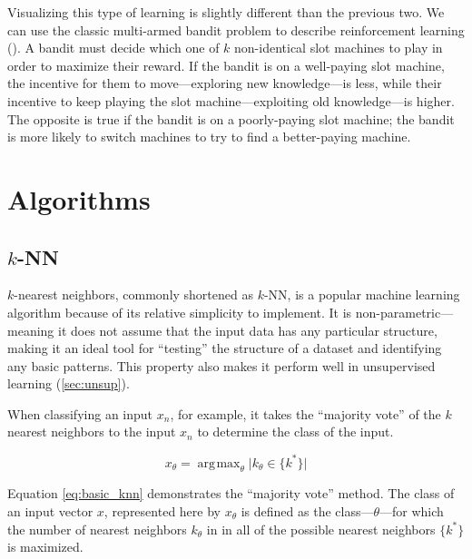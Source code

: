 \documentclass[a4paper]{comjnl}
\newcommand{\abs}[1]{\lvert #1 \rvert}
\DeclareMathOperator*{\argmax}{\arg\!\max}
\numberwithin{equation}{subsection}
\begin{document}
            Visualizing this type of learning is slightly different than the previous two. We can
            use the classic multi-armed bandit problem to describe reinforcement learning
            (\cite{auerp}). A bandit must decide which one of $k$ non-identical slot machines to
            play in order to maximize their reward. If the bandit is on a well-paying slot machine,
            the incentive for them to move---exploring new knowledge---is less, while their incentive
            to keep playing the slot machine---exploiting old knowledge---is higher. The opposite is
            true if the bandit is on a poorly-paying slot machine; the bandit is more likely to
            switch machines to try to find a better-paying machine.


    \section{Algorithms}\label{sec:alg}

        \subsection{$k$-NN}\label{subsec:knn}

            $k$-nearest neighbors, commonly shortened as $k$-NN, is a popular machine learning
            algorithm because of its relative simplicity to implement. It is non-parametric---
            meaning it does not assume that the input data has any particular structure, making it
            an ideal tool for ``testing'' the structure of a dataset and identifying any basic
            patterns. This property also makes it perform well in unsupervised learning
            (\ref{sec:unsup}).

            When classifying an input $x_n$, for example, it takes the ``majority vote'' of the $k$
            nearest neighbors to the input $x_n$ to determine the class of the input. 

            \begin{equation}\label{eq:basic_knn}
                x_{\theta}=\argmax_{\theta} \abs{k_{\theta} \in \{k^*\}}
            \end{equation}

            \noindent Equation \eqref{eq:basic_knn} demonstrates the ``majority vote'' method.
            The class of an input vector $x$, represented here by $x_{\theta}$ is defined as the
            class---$\theta$---for which the number of nearest neighbors $k_{\theta}$ in in all of
            the possible nearest neighbors $\{k^*\}$ is maximized.
\end{document}
